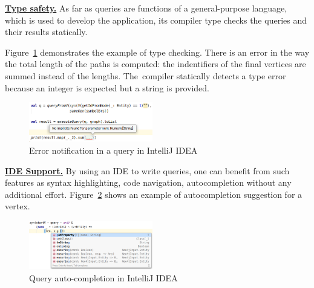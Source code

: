 \underline{\textbf{Type safety.}}
As far as queries are functions of a general-purpose language, which is used to develop the application, its compiler type checks the queries and their results statically.

Figure~\ref{fig:types} demonstrates the example of type checking.
There is an error in the way the total length of the paths is computed: the indentifiers of the final vertices are summed instead of the lengths.
The~compiler statically detects a type error because an integer is expected but a string is provided.

\begin{figure}[ht]
   \includegraphics[width=0.48\textwidth]{pictures/image.png}
   \vspace{-0.2cm}
   \caption{Error notification in a query in IntelliJ IDEA}
   \label{fig:types}
\end{figure}

\underline{\textbf{IDE Support.}}
By using an IDE to write queries, one can benefit from such features as syntax highlighting, code navigation, autocompletion without any additional effort.
Figure~\ref{fig:autocompletion} shows an example of autocompletion suggestion for a vertex.

\begin{figure}[ht]
    \centering
    \includegraphics[width=0.48\textwidth]{pictures/image1.png}
    \caption{Query auto-completion in IntelliJ IDEA}
    \label{fig:autocompletion}
\end{figure}
